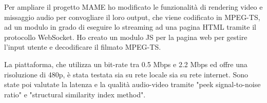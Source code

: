 Per ampliare il progetto MAME ho modificato le funzionalità di rendering video e missaggio audio per convogliare il loro output, che viene codificato in MPEG-TS, ad un modulo in grado di eseguire lo streaming ad una pagina HTML tramite il protocollo WebSocket. Ho creato un modulo JS per la pagina web per gestire l'input utente e decodificare il filmato MPEG-TS.

La piattaforma, che utilizza un bit-rate tra 0.5 Mbps e 2.2 Mbps ed offre una risoluzione di 480p, è stata testata sia su rete locale sia su rete internet. Sono state poi valutate la latenza e la qualità audio-video tramite "peek signal-to-noise ratio" e "structural similarity index method".





\cite{ARealTimeStreamingGamesonDemandSystem}
\cite{CombinedICTTechnologiesforSupervisionofComplexOperationsinResilientCommunities}
\cite{A_Network_Analysis_on_Cloud_Gaming_Stadia_GeForce_Now_and_PSNow}
\cite{Cloud_for_Gaming}
\cite{Cloud_Gaming_Architecture_and_Performance}



